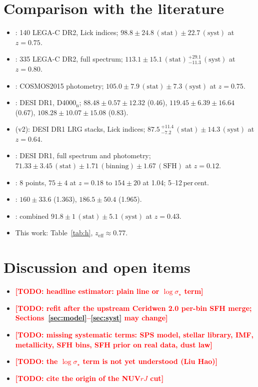 \documentclass[fleqn,usenatbib]{mnras}
\newcommand{\todo}[1]{\textcolor{red}{\textbf{[TODO: #1]}}}
\newcommand{\sig}{\ensuremath{\sigma_\star}}
\newcommand{\zeff}{\ensuremath{z_\mathrm{eff}}}
\begin{document}
\section{Comparison with the literature}
\begin{itemize}
\item \citet{Borghi2022b}: 140 LEGA-C DR2, Lick indices; $98.8\pm24.8\,(\mathrm{stat})\pm22.7\,(\mathrm{syst})$ at $z=0.75$.
\item \citet{Jiao2023}: 335 LEGA-C DR2, full spectrum; $113.1\pm15.1\,(\mathrm{stat})\,^{+29.1}_{-11.3}\,(\mathrm{syst})$ at $z=0.80$.
\item \citet{Jimenez2023}: COSMOS2015 photometry; $105.0\pm7.9\,(\mathrm{stat})\pm7.3\,(\mathrm{syst})$ at $z=0.75$.
\item \citet{Loubser2025}: DESI DR1, D4000$_\mathrm{n}$; $88.48\pm0.57\pm12.32$ (0.46), $119.45\pm6.39\pm16.64$ (0.67), $108.28\pm10.07\pm15.08$ (0.83).
\item \citet{Alvarez2026} (v2): DESI DR1 LRG stacks, Lick indices; $87.5\,^{+11.4}_{-7.2}\,(\mathrm{stat})\pm14.3\,(\mathrm{syst})$ at $z=0.64$.
\item \citet{Wang2026}: DESI DR1, full spectrum and photometry; $71.33\pm3.45\,(\mathrm{stat})\pm1.71\,(\mathrm{binning})\pm1.67\,(\mathrm{SFH})$ at $z=0.12$.
\item \citet{Moresco2012}: 8 points, $75\pm4$ at $z=0.18$ to $154\pm20$ at 1.04; 5--12\,per\,cent.
\item \citet{Moresco2015}: $160\pm33.6$ (1.363), $186.5\pm50.4$ (1.965).
\item \citet{Moresco2016}: combined $91.8\pm1\,(\mathrm{stat})\pm5.1\,(\mathrm{syst})$ at $z=0.43$.
\item This work: Table~\ref{tab:h}, $\zeff\approx0.77$.
\end{itemize}

\section{Discussion and open items}
\begin{itemize}
\item \todo{headline estimator: plain line or $\log\sig$ term}
\item \todo{refit after the upstream Ceridwen 2.0 per-bin SFH merge; Sections~\ref{sec:model}--\ref{sec:syst} may change}
\item \todo{missing systematic terms: SPS model, stellar library, IMF, metallicity, SFH bins, SFH prior on real data, dust law}
\item \todo{the $\log\sig$ term is not yet understood (Liu Hao)}
\item \todo{cite the origin of the NUV$rJ$ cut}
\end{itemize}
\end{document}
